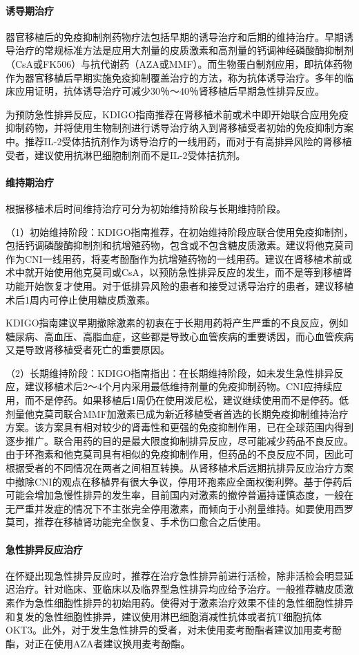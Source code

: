 \paragraph{诱导期治疗}

器官移植后的免疫抑制剂药物疗法包括早期的诱导治疗和后期的维持治疗。早期诱导治疗的常规标准方法是应用大剂量的皮质激素和高剂量的钙调神经磷酸酶抑制剂（CsA或FK506）与抗代谢药（AZA或MMF）。而生物蛋白制剂应用，即抗体药物作为器官移植后早期实施免疫抑制覆盖治疗的方法，称为抗体诱导治疗。多年的临床应用证明，抗体诱导治疗可减少30％～40％肾移植后早期急性排异反应。

为预防急性排异反应，KDIGO指南推荐在肾移植术前或术中即开始联合应用免疫抑制药物，并将使用生物制剂进行诱导治疗纳入到肾移植受者初始的免疫抑制方案中。推荐IL-2受体拮抗剂作为诱导治疗的一线用药，而对于有高排异风险的肾移植受者，建议使用抗淋巴细胞制剂而不是IL-2受体拮抗剂。
\paragraph{维持期治疗}

根据移植术后时间维持治疗可分为初始维持阶段与长期维持阶段。

（1）初始维持阶段：KDIGO指南推荐，在初始维持阶段应联合使用免疫抑制剂，包括钙调磷酸酶抑制剂和抗增殖药物，包含或不包含糖皮质激素。建议将他克莫司作为CNI一线用药，将麦考酚酯作为抗增殖药物的一线用药。建议在肾移植术前或术中就开始使用他克莫司或CsA，以预防急性排异反应的发生，而不是等到移植肾功能开始恢复才使用。对于低排异风险的患者和接受过诱导治疗的患者，建议移植术后1周内可停止使用糖皮质激素。

KDIGO指南建议早期撤除激素的初衷在于长期用药将产生严重的不良反应，例如糖尿病、高血压、高脂血症，这些都是导致心血管疾病的重要诱因，而心血管疾病又是导致肾移植受者死亡的重要原因。

（2）长期维持阶段：KDIGO指南指出：在长期维持阶段，如未发生急性排异反应，建议移植术后2～4个月内采用最低维持剂量的免疫抑制药物。CNI应持续应用，而不是停药。如果移植后1周仍在使用泼尼松，建议继续使用而不是停药。低剂量他克莫司联合MMF加激素已成为新近移植受者首选的长期免疫抑制维持治疗方案。该方案具有相对较少的肾毒性和更强的免疫抑制作用，已在全球范围内得到逐步推广。联合用药的目的是最大限度抑制排异反应，尽可能减少药品不良反应。由于环孢素和他克莫司具有相似的免疫抑制作用，但药品的不良反应不同，因此可根据受者的不同情况在两者之间相互转换。从肾移植术后远期抗排异反应治疗方案中撤除CNI的观点在移植界有很大争议，停用环孢素应全面权衡利弊。基于停药后可能会增加急慢性排异的发生率，目前国内对激素的撤停普遍持谨慎态度，一般在无严重并发症的情况下不主张完全停用激素，而倾向于小剂量维持。如要使用西罗莫司，推荐在移植肾功能完全恢复、手术伤口愈合之后使用。
\paragraph{急性排异反应治疗}

在怀疑出现急性排异反应时，推荐在治疗急性排异前进行活检，除非活检会明显延迟治疗。针对临床、亚临床以及临界型急性排异均应给予治疗。一般推荐糖皮质激素作为急性细胞性排异的初始用药。使得对于激素治疗效果不佳的急性细胞性排异和复发的急性细胞性排异，建议使用淋巴细胞消减性抗体或者抗T细胞抗体OKT3。此外，对于发生急性排异的受者，对未使用麦考酚酯者建议加用麦考酚酯，对正在使用AZA者建议换用麦考酚酯。